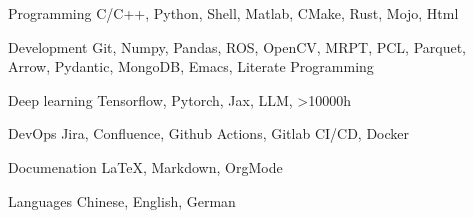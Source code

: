 \documentclass[../cv.tex]{subfiles}
\begin{document}


\begin{cvskills}

  \cvskill
    {Programming} %
    {C/C++, Python, Shell, Matlab, CMake, Rust, Mojo, Html} %

  \cvskill
    {Development} %
    {Git, Numpy, Pandas, ROS, OpenCV, MRPT, PCL, Parquet, Arrow, Pydantic, MongoDB, Emacs, Literate Programming} %

  \cvskill
    {Deep learning} %
    {Tensorflow, Pytorch, Jax, LLM, >10000h} %

  \cvskill
    {DevOps} %
    {Jira, Confluence, Github Actions, Gitlab CI/CD, Docker} %

  \cvskill
    {Documenation} %
    {LaTeX, Markdown, OrgMode} %

  \cvskill
    {Languages} %
    {Chinese, English, German} %

\end{cvskills}
\end{document}
